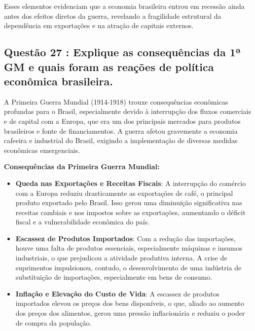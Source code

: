 \documentclass[a4paper,12pt]{article}[abntex2]
\begin{document}
Esses elementos evidenciam que a economia brasileira entrou em recessão ainda antes dos efeitos diretos da guerra, revelando a fragilidade estrutural da dependência em exportações e na atração de capitais externos.

\subsection{\textbf{Questão 27 : Explique as consequências da 1ª GM e quais foram as reações de política econômica brasileira.}}

A Primeira Guerra Mundial (1914-1918) trouxe consequências econômicas profundas para o Brasil, especialmente devido à interrupção dos fluxos comerciais e de capital com a Europa, que era um dos principais mercados para produtos brasileiros e fonte de financiamentos. A guerra afetou gravemente a economia cafeeira e industrial do Brasil, exigindo a implementação de diversas medidas econômicas emergenciais.

\textbf{Consequências da Primeira Guerra Mundial:}
\begin{itemize}
    \item \textbf{Queda nas Exportações e Receitas Fiscais}: A interrupção do comércio com a Europa reduziu drasticamente as exportações de café, o principal produto exportado pelo Brasil. Isso gerou uma diminuição significativa nas receitas cambiais e nos impostos sobre as exportações, aumentando o déficit fiscal e a vulnerabilidade econômica do país.
    \item \textbf{Escassez de Produtos Importados}: Com a redução das importações, houve uma falta de produtos essenciais, especialmente máquinas e insumos industriais, o que prejudicou a atividade produtiva interna. A crise de suprimentos impulsionou, contudo, o desenvolvimento de uma indústria de substituição de importações, especialmente em bens de consumo.
    \item \textbf{Inflação e Elevação do Custo de Vida}: A escassez de produtos importados elevou os preços dos bens disponíveis, o que, aliado ao aumento dos preços dos alimentos, gerou uma pressão inflacionária e reduziu o poder de compra da população.
\end{itemize}
\end{document}
